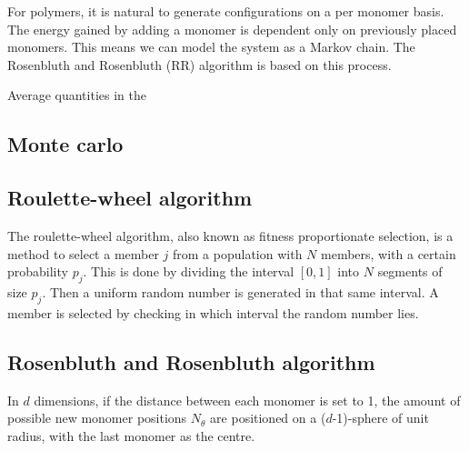 For polymers, it is natural to generate configurations on a per monomer basis. The energy gained by adding a monomer is dependent only on previously placed monomers. This means we can model the system as a Markov chain. The Rosenbluth and Rosenbluth (RR) algorithm is based on this process.


Average quantities in the 

\subsection{Monte carlo}

\subsection{Roulette-wheel algorithm}
The roulette-wheel algorithm, also known as fitness proportionate selection, is a method to select a member $j$ from a population with $N$ members, with a certain probability $p_j$. This is done by dividing the interval $[0,1]$ into $N$ segments of size $p_j$. Then a uniform random number is generated in that same interval. A member is selected by checking in which interval the random number lies.


\subsection{Rosenbluth and Rosenbluth algorithm}
In $d$ dimensions, if the distance between each monomer is set to 1, the amount of possible new monomer positions $N_{\theta}$ are positioned on a ($d$-1)-sphere of unit radius, with the last monomer as the centre.
